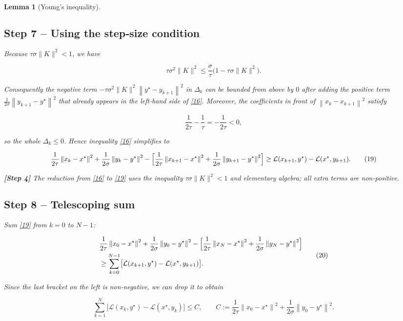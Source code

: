 \documentclass{article}
\newtheorem{lemma}{Lemma}
\newcommand{\norm}[1]{\left\|#1\right\|}
\begin{document}
\begin{lemma}[Young’s inequality]
\subsection*{Step 7 – Using the step‑size condition}
Because $\tau\sigma\|K\|^{2}<1$, we have  

\[
\tau\sigma^{2}\|K\|^{2}\le \frac{\sigma}{\tau}\bigl(1-\tau\sigma\|K\|^{2}\bigr).
\tag{18}
\]

Consequently the negative term $-\tau\sigma^{2}\|K\|^{2}\norm{y^{\star}-y_{k+1}}^{2}$ in $\Delta_{k}$ can be bounded from above by $0$ after adding the positive term $\frac{1}{2\sigma}\norm{y_{k+1}-y^{\star}}^{2}$ that already appears in the left‑hand side of \eqref{16}. Moreover, the coefficients in front of $\norm{x_{k}-x_{k+1}}^{2}$ satisfy  

\[
\frac{1}{2\tau}-\frac{1}{\tau}=-\frac{1}{2\tau}<0,
\]

so the whole $\Delta_{k}\le0$. Hence inequality \eqref{16} simplifies to

\[
\frac{1}{2\tau}\norm{x_{k}-x^{\star}}^{2}
 +\frac{1}{2\sigma}\norm{y_{k}-y^{\star}}^{2}
-
\Bigl[\frac{1}{2\tau}\norm{x_{k+1}-x^{\star}}^{2}
      +\frac{1}{2\sigma}\norm{y_{k+1}-y^{\star}}^{2}\Bigr]
\ge
\mathcal L(x_{k+1},y^{\star})-\mathcal L(x^{\star},y_{k+1}) .
\tag{19}
\]

\textbf{[Step 4]} The reduction from \eqref{16} to \eqref{19} uses the inequality $\tau\sigma\|K\|^{2}<1$ and elementary algebra; all extra terms are non‑positive.

\subsection*{Step 8 – Telescoping sum}
Sum \eqref{19} from $k=0$ to $N-1$:

\[
\begin{aligned}
&\frac{1}{2\tau}\norm{x_{0}-x^{\star}}^{2}
 +\frac{1}{2\sigma}\norm{y_{0}-y^{\star}}^{2}
-
\Bigl[\frac{1}{2\tau}\norm{x_{N}-x^{\star}}^{2}
      +\frac{1}{2\sigma}\norm{y_{N}-y^{\star}}^{2}\Bigr] \\
&\ge
\sum_{k=0}^{N-1}\bigl[\mathcal L(x_{k+1},y^{\star})-\mathcal L(x^{\star},y_{k+1})\bigr].
\end{aligned}
\tag{20}
\]

Since the last bracket on the left is non‑negative, we can drop it to obtain

\[
\sum_{k=1}^{N}\bigl[\mathcal L(x_{k},y^{\star})-\mathcal L(x^{\star},y_{k})\bigr]
\le
C,
\qquad
C:=\frac{1}{2\tau}\norm{x_{0}-x^{\star}}^{2}
   +\frac{1}{2\sigma}\norm{y_{0}-y^{\star}}^{2}.
\tag{21}
\]


\end{lemma}
\end{document}
